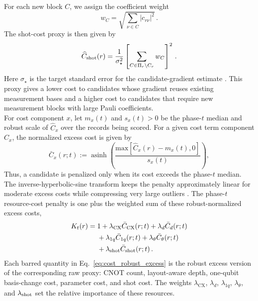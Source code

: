 \documentclass[
  reprint,
  amsmath,
  amssymb,
  aps,
  pra,
  nofootinbib,
  superscriptaddress,
  floatfix
]{revtex4-2}
\begin{document}
For each new block \(C\), we assign the coefficient weight
\[
w_C = \sqrt{\sum_{\nu\in C}|c_{r\nu}|^2}\,.
\]
The shot-cost proxy is then given by
\begin{equation*}
\widehat C_{\rm shot}(r)=
\frac{1}{\sigma_\star^2}
\left[
\sum_{C\in\Pi_r\setminus C_r}
w_C
\right]^2\,.
\end{equation*}
%
Here $\sigma_\star$ is the target standard error for the candidate-gradient estimate \cite{Ikhtiarudin2025ShotEfficient}. This proxy gives a lower cost to candidates whose gradient reuses existing measurement bases and a higher cost to candidates that require new measurement blocks with large Pauli coefficients.\\
For cost component \(x\), let \(m_x(t)\) and \(s_x(t)>0\) be the phase-\(t\) median and robust scale of \(\widehat C_x\) over the records being scored. For a given cost term component $\widehat C_x$, the normalized excess cost is given by
%
\begin{equation}
\bar C_x(r;t):=
\operatorname{asinh}
\left(
\frac{\text{max}[\widehat C_x(r)-m_x(t), 0]}{s_x(t)}
\right),
\label{eq:cost_robust_excess}
\end{equation}
%
Thus, a candidate is penalized only when its cost exceeds the phase-\(t\) median. The inverse-hyperbolic-sine transform keeps the penalty approximately linear for moderate excess costs while compressing very large outliers \cite{IglewiczHoaglin1993,Burbidge1988IHS}.
The phase-\(t\) resource-cost penalty is one plus the weighted sum of these robust-normalized excess costs,
\begin{equation}
\begin{aligned}
K_t(r)
={}&
1+\lambda_{\mathrm{CX}}\bar C_{\mathrm{CX}}(r;t)
+\lambda_d \bar C_d(r;t)\\
&+\lambda_{1q}\bar C_{1q}(r;t)
 +\lambda_\theta \bar C_\theta(r;t)\\
&+\lambda_{\rm shot}\bar C_{\rm shot}(r;t)\,.
\end{aligned}
\label{eq:hardware_cost_sum}
\end{equation}
%
Each barred quantity in Eq.~\eqref{eq:cost_robust_excess} is the robust excess version of the corresponding raw proxy: CNOT count, layout-aware depth, one-qubit basis-change cost, parameter cost, and shot cost. The weights \(\lambda_{\mathrm{CX}}\), \(\lambda_d\), \(\lambda_{1q}\), \(\lambda_\theta\), and \(\lambda_{\rm shot}\) set the relative importance of these resources.
\end{document}
